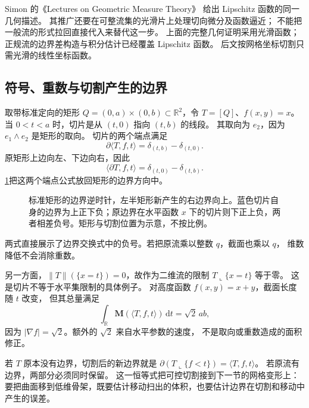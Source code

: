 Simon 的《Lectures on Geometric Measure Theory》%
\cite[28.1 LEMMA, 28.2 REMARK, 28.3, 28.4 DEFINITION, and 28.5 LEMMA]{Simon1983Lectures}给出 Lipschitz 函数的同一几何描述。
其推广还要在可整流集的光滑片上处理切向微分及函数逼近；
不能把一般流的形式拉回直接代入来替代这一步。
上面的完整几何证明采用光滑函数；正规流的边界差构造与积分估计已经覆盖 Lipschitz 函数。
后文按网格坐标切割只需光滑的线性坐标函数。

\subsection{符号、重数与切割产生的边界}
\label{b1:subsec:D10403}

取带标准定向的矩形
\(Q=(0,a)\times(0,b)\subset\mathbb R^2\)，令 \(T=[Q]\)、\(f(x,y)=x\)。
当 \(0<t<a\) 时，切片是从 \((t,0)\) 指向 \((t,b)\) 的线段。
其取向为 \(e_2\)，因为 \(e_1\wedge e_2\) 是矩形的取向。
切片的两个端点满足
\[
 \partial\langle T,f,t\rangle
    =\delta_{(t,b)}-\delta_{(t,0)}.
\]
原矩形上边向左、下边向右，因此
\[
 \langle\partial T,f,t\rangle
    =\delta_{(t,0)}-\delta_{(t,b)}.
\]
\cref{b1:fig:current-rectangle-slice-sign}把这两个端点公式放回矩形的边界方向中。
\begin{figure}[htbp]
\centering
{}
\caption[矩形切片与端点符号]{标准矩形的边界逆时针，左半矩形新产生的右边界向上。蓝色切片自身的边界为上正下负；原边界在水平函数 \(x\) 下的切片则下正上负，两者相差负号。矩形与切割位置为示意，不按比例。}
\label{b1:fig:current-rectangle-slice-sign}
\end{figure}

两式直接展示了边界交换式中的负号。若把原流乘以整数 \(q\)，截面也乘以 \(q\)，
维数降低不会消除重数。

\ProseParagraphBreak

另一方面，\(\|T\|(\{x=t\})=0\)，故作为二维流的限制
\(T\llcorner\{x=t\}\) 等于零。
这是切片不等于水平集限制的具体例子。
对高度函数 \(f(x,y)=x+y\)，截面长度随 \(t\) 改变，
但其总量满足
\[
 \int_{\mathbb R}\mathbf M(\langle T,f,t\rangle)\,\mathrm{d}t
       =\sqrt2\,ab,
\]
因为 \(|\nabla f|=\sqrt2\)。额外的 \(\sqrt2\) 来自水平参数的速度，
不是取向或重数造成的面积修正。

\ProseParagraphBreak

若 \(T\) 原本没有边界，切割后的新边界就是
\(\partial(T\llcorner\{f<t\})=\langle T,f,t\rangle\)。
若原流有边界，两部分必须同时保留。
这一恒等式把可控切割接到下一节的网格变形上：
要把曲面移到低维骨架，既要估计移动扫出的体积，也要估计边界在切割和移动中产生的误差。
